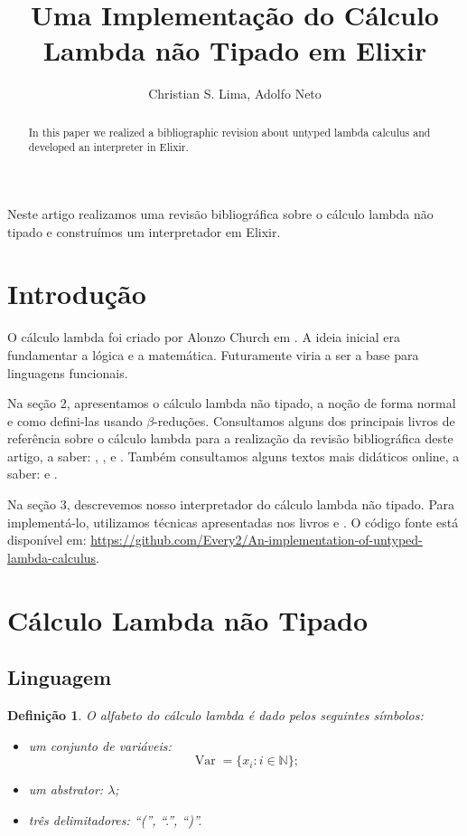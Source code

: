 \documentclass[12pt]{article}
\title{Uma Implementação do Cálculo Lambda não Tipado em Elixir}
\author{Christian S. Lima\inst{1}, Adolfo Neto\inst{1} }
\newtheorem{definition}{Definição}
\DeclareMathOperator{\Var}{\mathrm{Var}}
\begin{document}
 

\maketitle

\begin{abstract}
	In this paper we realized a bibliographic revision about untyped lambda calculus and developed an interpreter in Elixir.
\end{abstract}
     
\begin{resumo} 
	Neste artigo realizamos uma revisão bibliográfica sobre o cálculo lambda não tipado e construímos um interpretador em Elixir.
\end{resumo}

\section{Introdução}
O cálculo lambda foi criado por Alonzo Church em \cite{church1932}. A ideia inicial era fundamentar a lógica e a matemática. Futuramente viria a ser a base para linguagens funcionais.

Na seção 2, apresentamos o cálculo lambda não tipado, a noção de forma normal e como defini-las usando $\beta$-reduções.
Consultamos alguns dos principais livros de referência sobre o cálculo lambda para a realização da revisão bibliográfica deste artigo, a saber: \cite{hindley2008lambda}, \cite{hindley1997basic}, \cite{sorensen2006lectures} e \cite{Barendregt1984-BARTLC}. Também consultamos alguns textos mais didáticos online, a saber: \cite{brandl-lcsbs} e \cite{brandl-pwlc}.

Na seção 3, descrevemos nosso interpretador do cálculo lambda não tipado. Para implementá-lo, utilizamos técnicas apresentadas nos livros \cite{nystrom2021crafting} e \cite{aho2022compilers}. O código fonte está disponível em: \url{https://github.com/Every2/An-implementation-of-untyped-lambda-calculus}.

\section{Cálculo Lambda não Tipado}

\subsection{Linguagem}

\begin{definition}
  O alfabeto do cálculo lambda é dado pelos seguintes símbolos:
  \begin{itemize}
  \item um conjunto de variáveis:
    $$\Var = \{x_i : i \in \mathbb{N}\};$$
  \item um abstrator: $\lambda$;
  \item três delimitadores: ``('', ``.'', ``)''.
  \end{itemize}
\end{definition}
\end{document}
